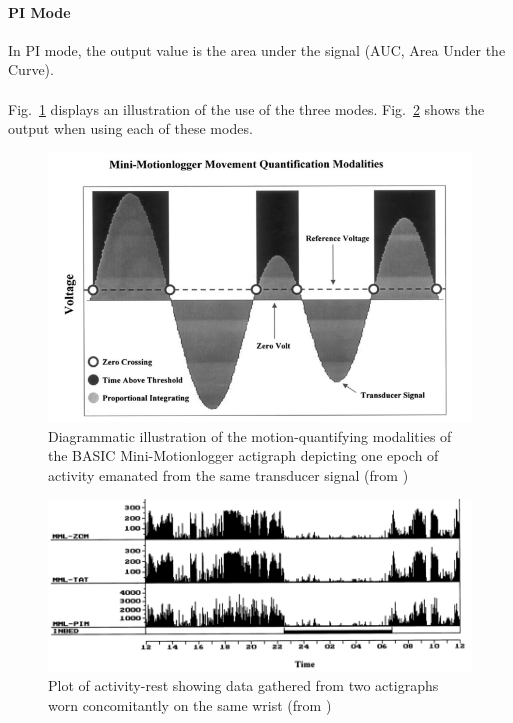 \documentclass[a4paper,12pt]{article}
\begin{document}
\paragraph{PI Mode}
In PI mode, the output value is the area under the signal (AUC, Area Under the Curve).

\paragraph{}
Fig.~\ref{actiModes2} displays an illustration of the use of the three modes. Fig.~\ref{actiModes1} shows the output when using each of these modes.

\begin{figure}[H]
\centering
\includegraphics[scale=0.5]{Images/actiModes2.png}
\caption{Diagrammatic illustration of the motion-quantifying modalities of the BASIC Mini-Motionlogger actigraph depicting one epoch of activity emanated from the same transducer signal (from \cite{Jean-Louis2001})}
\label{actiModes2}
\end{figure}

\begin{figure}[H]
\centering
\includegraphics[scale=0.4]{Images/actiModes1.png}
\caption{Plot of activity-rest showing data gathered from two actigraphs worn concomitantly on the same wrist (from \cite{Jean-Louis2001})}
\label{actiModes1}
\end{figure}
\end{document}
